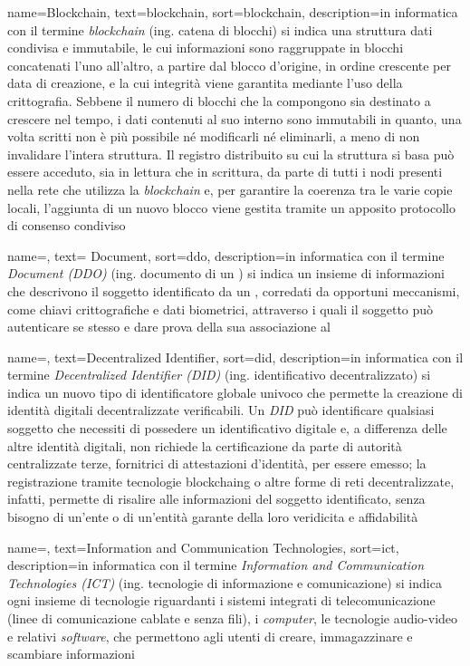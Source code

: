 {
	name=Blockchain,
	text=blockchain,
	sort=blockchain,
	description={in informatica con il termine \emph{blockchain} (ing. catena di blocchi) si indica una struttura dati condivisa e immutabile, le cui informazioni sono raggruppate in blocchi concatenati l'uno all'altro, a partire dal blocco d'origine, in ordine crescente per data di creazione, e la cui integrità viene garantita mediante l'uso della crittografia. Sebbene il numero di blocchi che la compongono sia destinato a crescere nel tempo, i dati contenuti al suo interno sono immutabili in quanto, una volta scritti non è più possibile né modificarli né eliminarli, a meno di non invalidare l'intera struttura. Il registro distribuito su cui la struttura si basa può essere acceduto, sia in lettura che in scrittura, da parte di tutti i nodi presenti nella rete che utilizza la \emph{blockchain} e, per garantire la coerenza tra le varie copie locali, l'aggiunta di un nuovo blocco viene gestita tramite un apposito protocollo di consenso condiviso}
}

{
	name=,
	text= Document,
	sort=ddo,
	description={in informatica con il termine \emph{ Document (DDO)} (ing. documento di un ) si indica un insieme di informazioni che descrivono il soggetto identificato da un , corredati da opportuni meccanismi, come chiavi crittografiche e dati biometrici, attraverso i quali il soggetto può autenticare se stesso e dare prova della sua associazione al }
}

{
	name=,
	text=Decentralized Identifier,
	sort=did,
	description={in informatica con il termine \emph{Decentralized Identifier (DID)} (ing. identificativo decentralizzato) si indica un nuovo tipo di identificatore globale univoco che permette la creazione di identità digitali decentralizzate verificabili. Un \emph{DID} può identificare qualsiasi soggetto che necessiti di possedere un identificativo digitale e, a differenza delle altre identità digitali, non richiede la certificazione da parte di autorità centralizzate terze, fornitrici di attestazioni d'identità, per essere emesso; la registrazione tramite tecnologie \gls{blockchaing} o altre forme di reti decentralizzate, infatti, permette di risalire alle informazioni del soggetto identificato, senza bisogno di un'ente o di un'entità garante della loro veridicita e affidabilità}
}

{
	name=,
	text=Information and Communication Technologies,
	sort=ict,
	description={in informatica con il termine \emph{Information and Communication Technologies (ICT)} (ing. tecnologie di informazione e comunicazione) si indica ogni insieme di tecnologie riguardanti i sistemi integrati di telecomunicazione (linee di comunicazione cablate e senza fili), i \textit{computer}, le tecnologie audio-video e relativi \textit{software}, che permettono agli utenti di creare, immagazzinare e scambiare informazioni}
}

